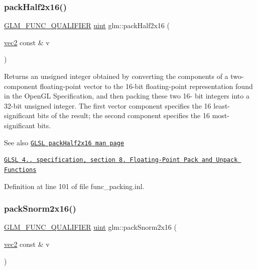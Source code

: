 \subsubsection{\texorpdfstring{pack\+Half2x16()}{packHalf2x16()}}
{\footnotesize\ttfamily \hyperlink{setup_8hpp_a33fdea6f91c5f834105f7415e2a64407}{G\+L\+M\+\_\+\+F\+U\+N\+C\+\_\+\+Q\+U\+A\+L\+I\+F\+I\+ER} \hyperlink{group__core__precision_ga4fd29415871152bfb5abd588334147c8}{uint} glm\+::pack\+Half2x16 (\begin{DoxyParamCaption}\item[{\hyperlink{group__core__types_gaa1618f51db67eaa145db101d8c8431d8}{vec2} const \&}]{v }\end{DoxyParamCaption})}

Returns an unsigned integer obtained by converting the components of a two-\/component floating-\/point vector to the 16-\/bit floating-\/point representation found in the Open\+GL Specification, and then packing these two 16-\/ bit integers into a 32-\/bit unsigned integer. The first vector component specifies the 16 least-\/significant bits of the result; the second component specifies the 16 most-\/significant bits.

\begin{DoxySeeAlso}{See also}
\href{http://www.opengl.org/sdk/docs/manglsl/xhtml/packHalf2x16.xml}{\tt G\+L\+SL pack\+Half2x16 man page} 

\href{http://www.opengl.org/registry/doc/GLSLangSpec.4.20.8.pdf}{\tt G\+L\+SL 4.. specification, section 8. Floating-\/\+Point Pack and Unpack Functions} 
\end{DoxySeeAlso}


Definition at line 101 of file func\+\_\+packing.\+inl.

\mbox{\label{group__core__func__packing_ga0c8005de240d6c4ca3d16c7bee25c622}} 
\subsubsection{\texorpdfstring{pack\+Snorm2x16()}{packSnorm2x16()}}
{\footnotesize\ttfamily \hyperlink{setup_8hpp_a33fdea6f91c5f834105f7415e2a64407}{G\+L\+M\+\_\+\+F\+U\+N\+C\+\_\+\+Q\+U\+A\+L\+I\+F\+I\+ER} \hyperlink{group__core__precision_ga4fd29415871152bfb5abd588334147c8}{uint} glm\+::pack\+Snorm2x16 (\begin{DoxyParamCaption}\item[{\hyperlink{group__core__types_gaa1618f51db67eaa145db101d8c8431d8}{vec2} const \&}]{v }\end{DoxyParamCaption})}

